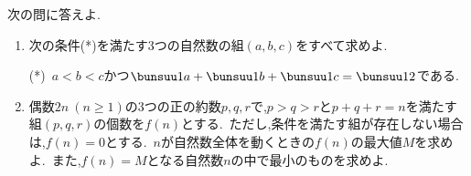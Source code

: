 \begin{problem}
次の問に答えよ.
  \begin{enumerate}[(1)\ ]
    \item 次の条件(*)を満たす3つの自然数の組$(a,b,c)$をすべて求めよ.
    \begin{center}
      (*)\ $a < b <c$かつ$\bunsuu1{a}+\bunsuu1{b}+\bunsuu1{c}=\bunsuu12$である.
    \end{center}
    \item 偶数$2n\ (n \geq 1)$の3つの正の約数$p,q,r$で,$p > q > r$と$p+q+r=n$を満たす組$(p,q,r)$の個数を$f(n)$とする.\, ただし,条件を満たす組が存在しない場合は,$f(n)=0$とする.\, $n$が自然数全体を動くときの$f(n)$の最大値$M$を求めよ.\, また,$f(n)=M$となる自然数$n$の中で最小のものを求めよ.
  \end{enumerate}
\end{problem}
